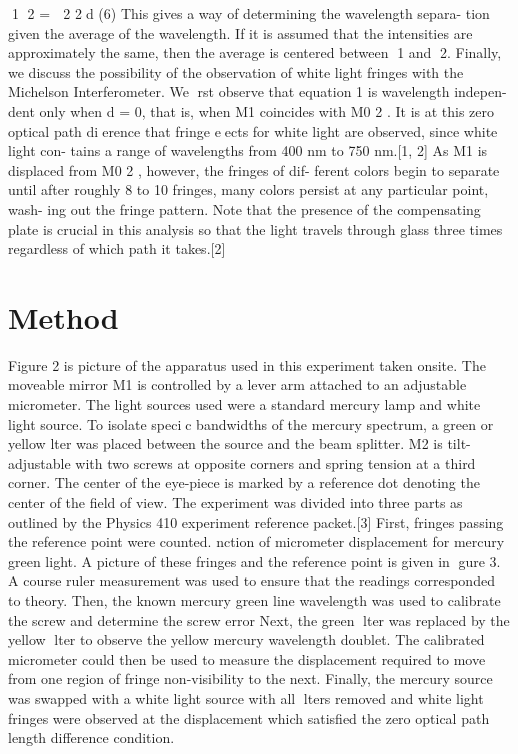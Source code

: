 \documentclass[12pt,twocolumn]{article}
\begin{document}
1  2 =

2
2d
(6)
This gives a way of determining the wavelength separa-
tion given the average of the wavelength. If it is assumed
that the intensities are approximately the same, then the
average is centered between 1 and 2.
Finally, we discuss the possibility of the observation
of white light fringes with the Michelson Interferometer.
We rst observe that equation 1 is wavelength indepen-
dent only when d = 0, that is, when M1 coincides with
M0
2
. It is at this zero optical path dierence that fringe
eects for white light are observed, since white light con-
tains a range of wavelengths from 400 nm to 750 nm.[1, 2]
As M1 is displaced from M0
2
, however, the fringes of dif-
ferent colors begin to separate until after roughly 8 to 10
fringes, many colors persist at any particular point, wash-
ing out the fringe pattern. Note that the presence of the
compensating plate is crucial in this analysis so that the
light travels through glass three times regardless of which
path it takes.[2]
\section{Method}
Figure 2 is picture of the apparatus used in this experiment taken onsite. The moveable mirror M1 is controlled by a lever arm attached to an adjustable micrometer. The light sources used were a standard mercury lamp and white light source. To isolate specic bandwidths of the mercury spectrum, a green or yellow lter was placed between the source and the beam splitter. M2 is tilt-adjustable with two screws at opposite corners and spring tension at a third corner. The center of the eye-piece is marked by a reference dot denoting the center of the field of view. The experiment was divided into three parts as outlined by the Physics 410 experiment reference packet.[3] First, fringes passing the reference point were counted.  
nction of micrometer displacement for mercury green light. A picture of these fringes and the reference point is given in gure 3. A course ruler measurement was used to ensure that the readings corresponded to theory. Then, the known mercury green line wavelength was used to calibrate the screw and determine the screw error
Next, the green lter was replaced by the yellow lter
to observe the yellow mercury wavelength doublet. The
calibrated micrometer could then be used to measure the
displacement required to move from one region of fringe
non-visibility to the next.
Finally, the mercury source was swapped with a white light source with all lters removed and white light fringes were observed at the displacement which satisfied the zero optical path length difference condition.
\end{document}
